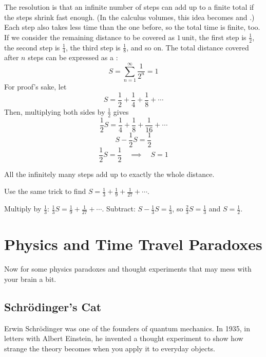 The resolution is that an infinite number of steps can add up to a finite
total if the steps shrink fast enough. (In the calculus volumes, this idea
becomes  and .) Each step also
takes less time than the one before, so the total time is finite, too. If we consider the remaining distance to be covered as $1 \, \mathrm{unit}$, the first step is $\frac{1}{2}$, the second step is $\frac{1}{4}$, the third step is $\frac{1}{8}$, and so on. The total distance covered after $n$ steps can be expressed as a :
\[
    S = \sum_{n=1}^{\infty} \frac{1}{2^n} = 1
\]
For proof's sake, let
$$S = \frac{1}{2} + \frac{1}{4} + \frac{1}{8} + \cdots$$
Then, multiplying both sides by $\frac{1}{2}$ gives
$$\frac{1}{2}S = \frac{1}{4} + \frac{1}{8} + \frac{1}{16} + \cdots$$
$$S - \frac{1}{2}S = \frac{1}{2}$$
$$\frac{1}{2}S = \frac{1}{2}    \quad \implies \quad    S = 1$$

All the infinitely many steps add up to exactly the whole distance.

\begin{Exercise}[title={Another infinite sum}, label=par_zeno]
Use the same trick to find
$S = \frac{1}{3} + \frac{1}{9} + \frac{1}{27} + \cdots$.
\end{Exercise}
\begin{Answer}[ref=par_zeno]
Multiply by $\frac{1}{3}$: $\frac{1}{3}S = \frac{1}{9} + \frac{1}{27} +
\cdots$. Subtract: $S - \frac{1}{3}S = \frac{1}{3}$, so $\frac{2}{3}S =
\frac{1}{3}$ and $S = \frac{1}{2}$.
\end{Answer}


\section{Physics and Time Travel Paradoxes}
Now for some physics paradoxes and thought experiments that may mess with
your brain a bit.

\subsection{Schrödinger's Cat}
Erwin Schrödinger was one of the founders of quantum mechanics. In 1935,
in letters with Albert Einstein, he invented a thought experiment to show
how strange the theory becomes when you apply it to everyday objects.

